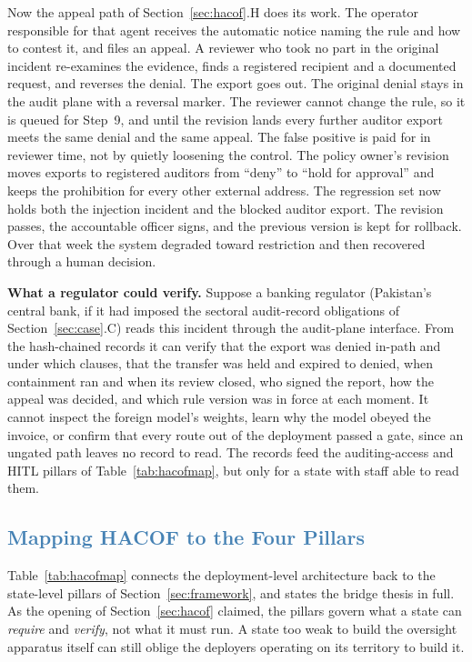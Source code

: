\documentclass[journal]{IEEEtran}
\newcommand{\hacof}{HACOF}
\begin{document}
Now the appeal path of Section~\ref{sec:hacof}.H does its work. The operator responsible for that agent receives the automatic notice naming the rule and how to contest it, and files an appeal. A reviewer who took no part in the original incident re-examines the evidence, finds a registered recipient and a documented request, and reverses the denial. The export goes out. The original denial stays in the audit plane with a reversal marker. The reviewer cannot change the rule, so it is queued for Step~9, and until the revision lands every further auditor export meets the same denial and the same appeal. The false positive is paid for in reviewer time, not by quietly loosening the control. The policy owner's revision moves exports to registered auditors from ``deny'' to ``hold for approval'' and keeps the prohibition for every other external address. The regression set now holds both the injection incident and the blocked auditor export. The revision passes, the accountable officer signs, and the previous version is kept for rollback. Over that week the system degraded toward restriction and then recovered through a human decision.

\textbf{What a regulator could verify.} Suppose a banking regulator (Pakistan's central bank, if it had imposed the sectoral audit-record obligations of Section~\ref{sec:case}.C) reads this incident through the audit-plane interface. From the hash-chained records it can verify that the export was denied in-path and under which clauses, that the transfer was held and expired to denied, when containment ran and when its review closed, who signed the report, how the appeal was decided, and which rule version was in force at each moment. It cannot inspect the foreign model's weights, learn why the model obeyed the invoice, or confirm that every route out of the deployment passed a gate, since an ungated path leaves no record to read. The records feed the auditing-access and HITL pillars of Table~\ref{tab:hacofmap}, but only for a state with staff able to read them.

\subsection{\textcolor{steelblue}{Mapping \hacof{} to the Four Pillars}}
\label{sec:hacof-mapping}

Table~\ref{tab:hacofmap} connects the deployment-level architecture back to the state-level pillars of Section~\ref{sec:framework}, and states the bridge thesis in full. As the opening of Section~\ref{sec:hacof} claimed, the pillars govern what a state can \textit{require} and \textit{verify}, not what it must run. A state too weak to build the oversight apparatus itself can still oblige the deployers operating on its territory to build it.
\end{document}
